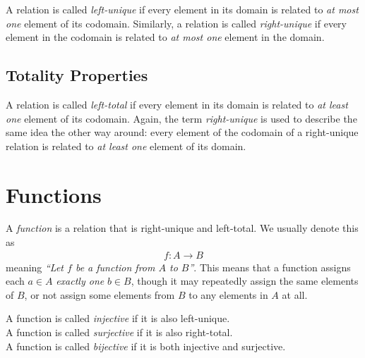 A relation is called \emph{left-unique} if every element in its domain
is related to \emph{at most one} element of its codomain.
Similarly, a relation is called \emph{right-unique} if every element in the
codomain is related to \emph{at most one} element in the domain.

\subsection{Totality Properties}

A relation is called \emph{left-total} if every element in its domain
is related to \emph{at least one} element of its codomain.
Again, the term \emph{right-unique} is used to describe the same idea
the other way around: every element of the codomain of a right-unique relation
is related to \emph{at least one} element of its domain.


\section{Functions}

\begin{definition}
  A \emph{function} is a relation that is right-unique and left-total.
  We usually denote this as
  \begin{align*}
    f \colon A \to B
  \end{align*}
  meaning \emph{``Let \(f\) be a function from \(A\) to \(B\)''}.
  This means that a function assigns each \(a \in A\) \emph{exactly one}
  \(b \in B\), though it may repeatedly assign the same elements of \(B\),
  or not assign some elements from \(B\) to any elements in \(A\) at all.
\end{definition}

\begin{definition}
  A function is called \emph{injective} if it is also left-unique.\\
  A function is called \emph{surjective} if it is also right-total.\\
  A function is called \emph{bijective} if it is both injective and surjective.
\end{definition}
